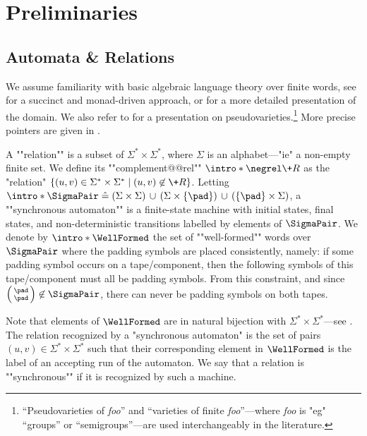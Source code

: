 \section{Preliminaries}
\label{sec:preliminaries}

\subsection{Automata \& Relations}

We assume familiarity with basic algebraic language theory over finite words, see \cite[\S 1, 2, 4, pp.~3--66 \& pp.~107--156]{Bojanczyk2020LanguagesMSO} for a succinct and monad-driven approach, or \cite[\S I--XIV, pp.~3--247]{Pin2022MathematicalFoundations} for a more detailed presentation of the domain.
We also refer to \cite{SW21varieties} for a presentation on pseudovarieties.\footnote{``Pseudovarieties of \emph{foo}'' and ``varieties of finite \emph{foo}''---where \emph{foo} is "eg" ``groups''
or ``semigroups''---are used interchangeably in the literature.}
More precise pointers are given in .

A \AP""relation"" is a subset of $\Sigma^*\times\Sigma^*$,
where $\Sigma$ is an alphabet---"ie" a non-empty finite set.
We define its \AP""complement@@rel"" \AP$\intro*\negrel \+R$ as the "relation" $\{(u,v) \in \Sigma^*\times \Sigma^* \mid (u,v) \not\in \+R\}$.
Letting
$\intro*\SigmaPair \defeq
(\Sigma \times \Sigma) \,\cup\,
(\Sigma \times \{\pad\}) \,\cup\,
(\{\pad\} \times \Sigma)$, a ""synchronous automaton"" is a finite-state machine with initial states, final states, and
non-deterministic transitions labelled by elements of $\SigmaPair$.
We denote by \AP$\intro*\WellFormed$ the set of \AP""well-formed"" words over $\SigmaPair$ where the padding symbols are placed consistently, namely: if some padding symbol occurs on a tape/component, then the following symbols of this tape/component must all be padding symbols.
From this constraint, and since $\pair{\pad}{\pad} \not\in \SigmaPair$,
there can never be padding symbols on both tapes.

Note that elements of $\WellFormed$ are in natural bijection with $\Sigma^*\times\Sigma^*$---see
.
The relation recognized by a "synchronous automaton" is the set of pairs $(u,v) \in \Sigma^*\times\Sigma^*$ such that their corresponding element in $\WellFormed$ is the label of
an accepting run of the automaton. We say that a relation is \AP""synchronous"" if it is recognized 
by such a machine.

